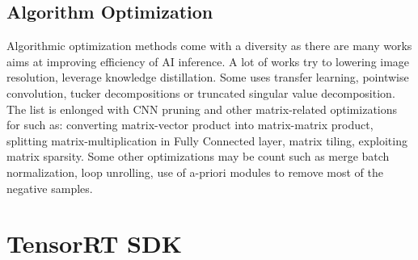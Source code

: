     \subsection{Algorithm Optimization}
        Algorithmic optimization methods come with a diversity as there are many works aims at improving efficiency of AI inference. A lot of works try to lowering image resolution, leverage knowledge distillation. 
        Some uses transfer learning, pointwise convolution, tucker decompositions or truncated singular value decomposition. The list is enlonged with CNN pruning and other matrix-related optimizations for such as: 
        converting matrix-vector product into matrix-matrix product, splitting matrix-multiplication in Fully Connected layer, matrix tiling, exploiting matrix sparsity. Some other optimizations may be count such 
        as merge batch normalization, loop unrolling, use of a-priori modules to remove most of the negative samples.

\section{TensorRT SDK}
